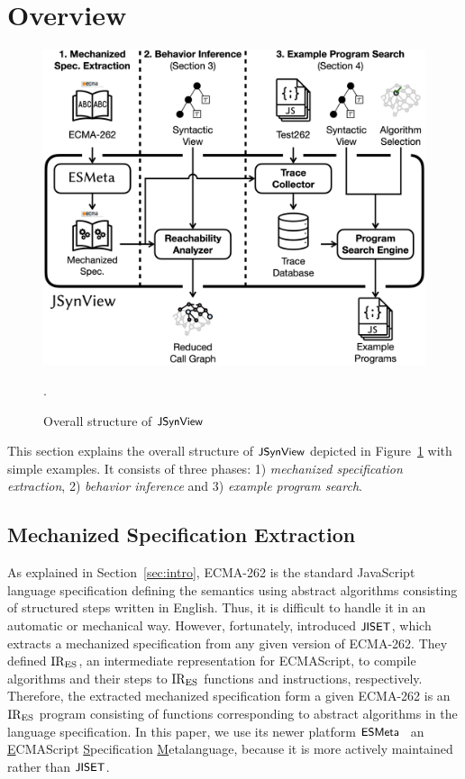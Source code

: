 \section{Overview}\label{sec:overview}

\begin{figure}
  \centering
  \includegraphics[width=\columnwidth]{img/overall.png}
  \caption{Overall structure of $\textsf{\small JSynView}$}
  \vspace*{-1em}
  \label{fig:overall}.
\end{figure}

This section explains the overall structure of $\textsf{\small JSynView}$ depicted in
Figure~\ref{fig:overall} with simple examples.  It consists of three phases: 1)
\textit{mechanized specification extraction}, 2) \textit{behavior inference} and
3) \textit{example program search}.

\subsection{Mechanized Specification Extraction}\label{sec:extract-spec}

As explained in Section~\ref{sec:intro}, ECMA-262 is the standard JavaScript
language specification defining the semantics using abstract algorithms
consisting of structured steps written in English.  Thus, it is difficult to
handle it in an automatic or mechanical way.  However, fortunately,
\citet{jiset} introduced $\textsf{\small JISET}$, which extracts a mechanized specification
from any given version of ECMA-262.  They defined $\text{IR}_\text{ES}$, an intermediate
representation for ECMAScript, to compile algorithms and their steps to $\text{IR}_\text{ES}$
functions and instructions, respectively.  Therefore, the extracted mechanized
specification form a given ECMA-262 is an $\text{IR}_\text{ES}$ program consisting of
functions corresponding to abstract algorithms in the language specification.
In this paper, we use its newer platform $\textsf{\small ESMeta}$~\cite{esmeta} an
\underline{E}CMAScript \underline{S}pecification \underline{M}etalanguage,
because it is more actively maintained rather than $\textsf{\small JISET}$.


